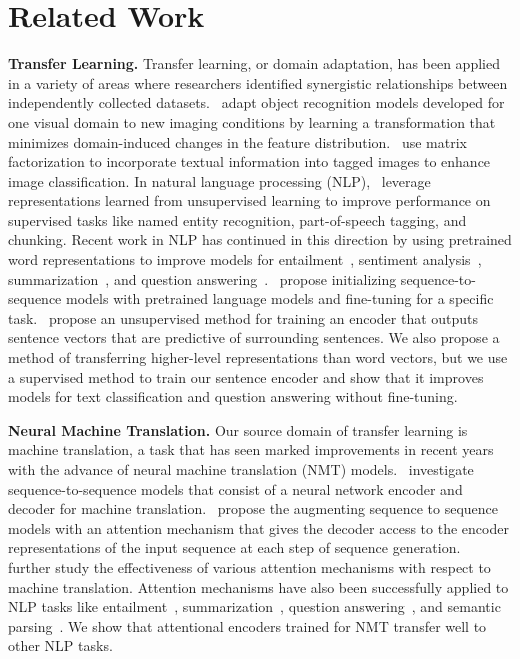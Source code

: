 \section{Related Work}

\textbf{Transfer Learning.}
Transfer learning, or domain adaptation, has been applied in a variety of areas where researchers identified synergistic relationships between independently collected datasets.~\citet{Saenko2010AdaptingVC} 
adapt object recognition models developed for one visual domain to new imaging conditions by learning a transformation that minimizes domain-induced changes in the feature distribution.~\citet{Zhu2011HeterogeneousTL}
use matrix factorization to incorporate textual information into tagged images to enhance image classification.
In natural language processing (NLP),~\citet{Collobert2011} leverage representations learned from unsupervised learning to improve performance on supervised tasks like named entity recognition, part-of-speech tagging, and chunking.
Recent work in NLP has continued in this direction by using pretrained word representations to improve models for
entailment~\citep{Bowman2014},
sentiment analysis~\citep{Socher2013EMNLP},
summarization~\citep{Nallapati2016AbstractiveTS},
and question answering~\citep{Seo2017BidirectionalAF,Xiong2017}.~\citet{Ramachandran2016UnsupervisedPF} propose initializing sequence-to-sequence models with pretrained language models and fine-tuning for a specific task.~\citet{Kiros2015SkipThoughtV} propose an unsupervised method for training an encoder that outputs sentence vectors that are predictive of surrounding sentences.
We also propose a method of transferring higher-level representations than word vectors, but we use a supervised method to train our sentence encoder and show that it improves models for text classification and question answering without fine-tuning.

\textbf{Neural Machine Translation.} 
Our source domain of transfer learning is machine translation, 
a task that has seen marked improvements in recent years with the advance of neural machine translation (NMT) models.~\citet{Sutskever2014} investigate sequence-to-sequence models that consist of a neural network encoder and decoder for machine translation.~\citet{Bahdanau2015} propose the augmenting sequence to sequence models with an attention mechanism that gives the decoder access to the encoder representations of the input sequence at each step of sequence generation.~\citet{Luong2015EffectiveAT} further study the effectiveness of various attention mechanisms with respect to machine translation.
Attention mechanisms have also been successfully applied to NLP tasks like
entailment~\citep{conneau2017supervised},
summarization~\citep{Nallapati2016AbstractiveTS},
question answering~\citep{Seo2017BidirectionalAF,Xiong2017,min2017question},
and semantic parsing~\citep{Dong2016LanguageTL}.
We show that attentional encoders trained for NMT transfer well to other NLP tasks.

